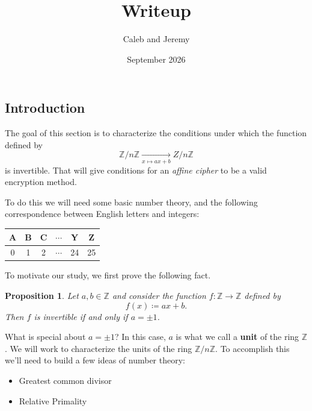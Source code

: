\documentclass{article}
\title{Writeup}
\author{Caleb and Jeremy}
\date{September 2026}
\newcommand{\blue}[1]{ {\color{blue}{#1}} }
\newcommand{\Z}{\mathbb{Z}}
\theoremstyle{plain}
\newtheorem{proposition}{Proposition}
\begin{document}
\maketitle

\section{}


\subsection{Introduction}

The goal of this section is to characterize the conditions under which the function defined by
\[ 
    \Z/n\Z \xrightarrow[x \mapsto ax+b]{} Z/n\Z
\]
is invertible.
That will give conditions for an \textit{affine cipher} to be a valid encryption method.

To do this we will need some basic number theory, and the following correspondence
between English letters and integers:
\begin{center}
\begin{tabular}{c|c|c|c|c|c}
    A & B & C & $\cdots$ & Y & Z  \\ \hline
    0 & 1 & 2 & $\cdots$ & 24 & 25
\end{tabular}
\end{center}

To motivate our study, we first prove the following fact.

\begin{proposition}
    Let $a,b \in \Z$ and consider the function $f: \Z \to \Z$ defined by 
    \[
        f(x) \coloneqq ax + b.
    \]
    Then $f$ is invertible if and only if $a=\pm1$.
\end{proposition}

\blue{
\begin{proof}
    Suppose $g$ is the inverse of $f$ and $g(x) = cx + d$.....
\end{proof}
}

What is special about $a=\pm1$?
In this case, $a$ is what we call a \textbf{unit} of the ring $\Z$.
We will work to characterize the units of the ring $\Z/n\Z$.
To accomplish this we'll need to build a few ideas of number theory:
\begin{itemize}
    \item Greatest common divisor 
    \item Relative Primality
\end{itemize}
\end{document}
